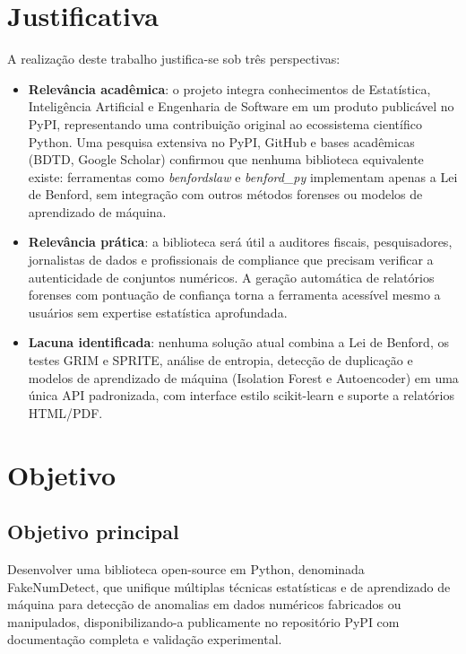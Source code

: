 \documentclass[
    12pt,                %
    openright,           %
    oneside,             %
    a4paper,             %
    english,             %
    brazil               %
]{abntex2}
\begin{document}
\section{Justificativa}
\label{sec:justificativa}

A realização deste trabalho justifica-se sob três perspectivas:

\begin{itemize}
    \item \textbf{Relevância acadêmica}: o projeto integra conhecimentos de Estatística, Inteligência Artificial e Engenharia de Software em um produto publicável no PyPI, representando uma contribuição original ao ecossistema científico Python. Uma pesquisa extensiva no PyPI, GitHub e bases acadêmicas (BDTD, Google Scholar) confirmou que nenhuma biblioteca equivalente existe: ferramentas como \textit{benfordslaw} e \textit{benford\_py} implementam apenas a Lei de Benford, sem integração com outros métodos forenses ou modelos de aprendizado de máquina.
    \item \textbf{Relevância prática}: a biblioteca será útil a auditores fiscais, pesquisadores, jornalistas de dados e profissionais de compliance que precisam verificar a autenticidade de conjuntos numéricos. A geração automática de relatórios forenses com pontuação de confiança torna a ferramenta acessível mesmo a usuários sem expertise estatística aprofundada.
    \item \textbf{Lacuna identificada}: nenhuma solução atual combina a Lei de Benford, os testes GRIM e SPRITE, análise de entropia, detecção de duplicação e modelos de aprendizado de máquina (Isolation Forest e Autoencoder) em uma única API padronizada, com interface estilo scikit-learn e suporte a relatórios HTML/PDF.
\end{itemize}

\section{Objetivo}
\label{sec:objetivo}

\subsection{Objetivo principal}

Desenvolver uma biblioteca open-source em Python, denominada FakeNumDetect, que unifique múltiplas técnicas estatísticas e de aprendizado de máquina para detecção de anomalias em dados numéricos fabricados ou manipulados, disponibilizando-a publicamente no repositório PyPI com documentação completa e validação experimental.
\end{document}
